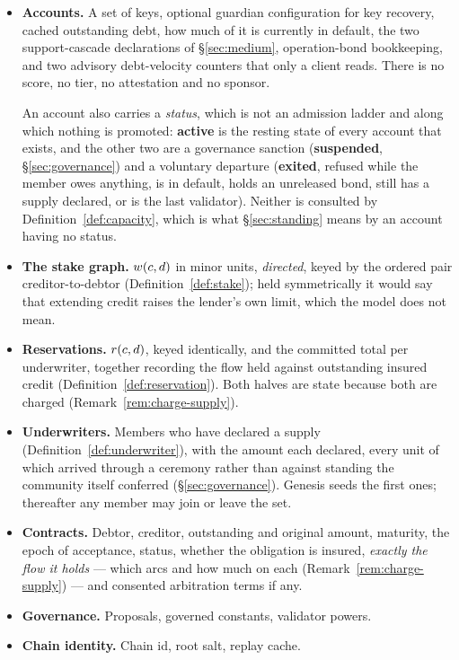 \begin{itemize}[leftmargin=1.4em]
  \item \textbf{Accounts.} A set of keys, optional guardian configuration for key
        recovery, cached outstanding debt, how much of it is currently in default, the
        two support-cascade declarations of \S\ref{sec:medium}, operation-bond
        bookkeeping, and two advisory debt-velocity counters that only a client reads.
        There is no score, no tier, no attestation and no sponsor.

        An account also carries a \emph{status}, which is not an admission ladder and
        along which nothing is promoted: \textbf{active} is the resting state of every
        account that exists, and the other two are a governance sanction
        (\textbf{suspended}, \S\ref{sec:governance}) and a voluntary departure
        (\textbf{exited}, refused while the member owes anything, is in default, holds an
        unreleased bond, still has a supply declared, or is the last validator). Neither
        is consulted by Definition~\ref{def:capacity}, which is what \S\ref{sec:standing}
        means by an account having no status.
  \item \textbf{The stake graph.} $w(c,d)$ in minor units, \emph{directed}, keyed by
        the ordered pair creditor-to-debtor (Definition~\ref{def:stake}); held
        symmetrically it would say that extending credit raises the lender's own limit,
        which the model does not mean.
  \item \textbf{Reservations.} $r(c,d)$, keyed identically, and the committed total per
        underwriter, together recording the flow held against outstanding insured credit
        (Definition~\ref{def:reservation}). Both halves are state because both are charged
        (Remark~\ref{rem:charge-supply}).
  \item \textbf{Underwriters.} Members who have declared a supply
        (Definition~\ref{def:underwriter}), with the amount each declared, every unit of
        which arrived through a ceremony rather than against standing the community
        itself conferred (\S\ref{sec:governance}). Genesis seeds the first ones;
        thereafter any member may join or leave the set.
  \item \textbf{Contracts.} Debtor, creditor, outstanding and original amount, maturity,
        the epoch of acceptance, status, whether the obligation is insured, \emph{exactly
        the flow it holds} --- which arcs and how much on each
        (Remark~\ref{rem:charge-supply}) --- and consented arbitration terms if any.
  \item \textbf{Governance.} Proposals, governed constants, validator powers.
  \item \textbf{Chain identity.} Chain id, root salt, replay cache.
\end{itemize}

